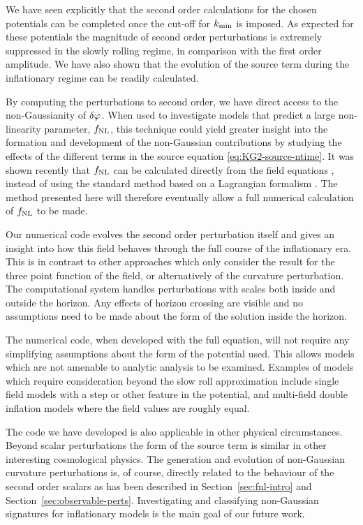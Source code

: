 We have seen explicitly that the second order calculations for the chosen
potentials can be completed once the cut-off for $k_{\mathrm{min}}$ is
imposed. As expected for these potentials the magnitude of second order perturbations
is extremely
suppressed in the slowly rolling regime, in comparison with the first order
amplitude.
We have also shown that the
evolution of the source term during the inflationary regime can be
readily calculated.


By computing the perturbations to second order, we have direct access
to the non-Gaussianity of $\delta\varphi_{}$. When used to investigate models
that predict a large non-linearity parameter, $f_{\mathrm{NL}}$, this technique
could yield greater insight into the formation and development of the
non-Gaussian contributions by studying the effects of the different
terms in the source equation \eqref{eq:KG2-source-ntime}.
%
It was shown recently that $f_{\mathrm{NL}}$ can be calculated directly from the field
equations \cite{Musso:2006pt,Seery:2008qj}, instead of
using the standard method based on a Lagrangian formalism
\cite{Maldacena:2002vr}. The method presented here
will
therefore eventually allow a full numerical calculation of $f_{\mathrm{NL}}$ to be made.

Our numerical code evolves the second order perturbation itself and gives an insight into how this
field behaves through the full course of the inflationary era. This is in contrast to other
approaches which only consider the result for the three point function of the field, or
alternatively of the curvature perturbation.
% 
The computational system handles perturbations with scales both inside and outside the horizon. Any
effects of horizon crossing are visible and no assumptions need to be made about the form of the
solution inside the horizon.

The numerical code, when developed with the full equation, will not require any simplifying
assumptions about the form of the potential used. This allows models which are not amenable to
analytic analysis to be examined. Examples of models which require consideration beyond the slow
roll approximation include single field models with a step or other feature in the potential, and
multi-field double inflation models where the field values are roughly equal.


The code we have developed is also applicable in other physical circumstances. Beyond scalar
perturbations the form of the source term is similar in other interesting cosmological physics. 
The generation and evolution of non-Gaussian curvature perturbations is, of course, directly related
to the behaviour of the second order scalars as has been described in Section~\ref{sec:fnl-intro}
and Section~\ref{sec:observable-perts}. Investigating and classifying non-Gaussian signatures for
inflationary models is the main goal of our future work.

